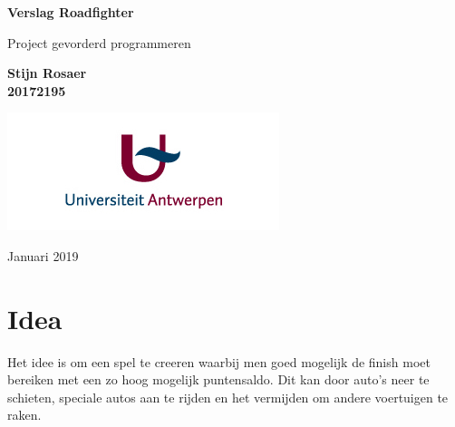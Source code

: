 \documentclass[12pt,a4paper]{article}
\begin{document}
\begin{titlepage}
   \begin{center}
       \vspace*{1cm}
 
       \textbf{{\huge Verslag Roadfighter}}
 
       \vspace{0.5cm}
        Project gevorderd programmeren
 
       \vspace{1.5cm}
 
       \textbf{{\Large Stijn Rosaer}\\20172195}
  
       \vspace{10cm}
 
       \includegraphics[scale=0.4]{img/logoua.jpg}

       Januari 2019
 
   \end{center}
\end{titlepage}
\newpage

\section{Idea}
Het idee is om een spel te creeren waarbij men goed mogelijk de finish moet bereiken met een zo hoog mogelijk puntensaldo. Dit kan door auto's neer te schieten, speciale autos aan te rijden en het vermijden om andere voertuigen te raken.
\end{document}
